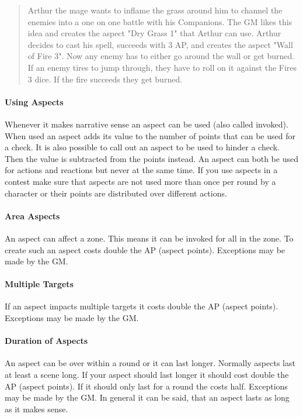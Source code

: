 \documentclass[11pt]{article}
\begin{document}
{\begin{quote}
Arthur the mage wants to inflame the grass around him to channel the enemies into a one on one battle with his Companions. The GM likes this idea and creates the aspect "Dry Grass 1" that Arthur can use. Arthur decides to cast his spell, succeeds with 3 AP, and creates the aspect "Wall of Fire 3". Now any enemy has to either go around the wall or get burned. If an enemy tires to jump through, they have to roll on it against the Fires 3 dice. If the fire succeeds they get burned.
\end{quote}

\paragraph*{Using Aspects}
\label{sec:org9c9cd19}

Whenever it makes narrative sense an aspect can be used (also called invoked). When used an aspect adds its value to the number of points that can be used for a check. It is also possible to call out an aspect to be used to hinder a check. Then the value is subtracted from the points instead. An aspect can both be used for actions and reactions but never at the same time. If you use aspects in a contest make sure that aspects are not used more than once per round by a character or their points are distributed over different actions.

\paragraph*{Area Aspects}
\label{sec:orgd648157}

An aspect can affect a zone. This means it can be invoked for all in the zone. To create such an aspect costs double the AP (aspect points). Exceptions may be made by the GM. 

\paragraph*{Multiple Targets}
\label{sec:org7ea6798}

If an aspect impacts multiple targets it costs double the AP (aspect points). Exceptions may be made by the GM.

\paragraph*{Duration of Aspects}
\label{sec:org489c421}

An aspect can be over within a round or it can last longer. Normally aspects last at least a scene long. If your aspect should last longer it should cost double the AP (aspect points). If it should only last for a round the costs half. Exceptions may be made by the GM. In general it can be said, that an aspect lasts as long as it makes sense.

}
\end{document}
